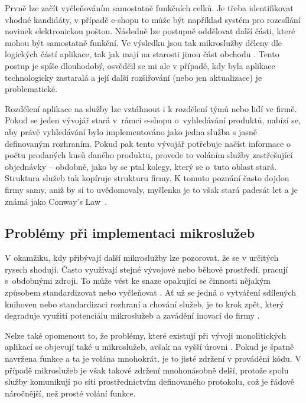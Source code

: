 \documentclass[FM,DP]{tulthesis}
\begin{document}
Prvně lze začít vyčleňováním samostatně funkčních celků. Je třeba identifikovat vhodné kandidáty, v případě e-shopu
to může být například systém pro rozesílání novinek elektronickou poštou. Následně lze postupně oddělovat další
části, které mohou být samostatně funkční. Ve výsledku jsou tak mikroslužby děleny dle logických částí
aplikace, tak jak mají na starosti jinou část obchodu \cite[strana~11]{microservices}. Tento postup je 
spíše dlouhodobý, osvědčil se mi ale v případě, kdy byla aplikace technologicky zastaralá a její další rozšiřování
(nebo jen aktualizace) je problematické.

Rozdělení aplikace na služby lze vztáhnout i k rozdělení týmů nebo lidí ve firmě. Pokud se jeden vývojář stará v~rámci 
e-shopu o~vyhledávání produktů, nabízí se, aby právě vyhledávání bylo implementováno jako jedna služba s jasně 
definovaným rozhraním. Pokud pak tento vývojář potřebuje načíst informace o počtu prodaných kusů daného produktu, 
provede to voláním služby zastřešující objednávky -- obdobně, jako by se ptal kolegy, který se o~tuto oblast stará.
Struktura služeb tak kopíruje strukturu firmy. K tomuto poznání často dojdou firmy samy, aniž by si to uvědomovaly, 
myšlenka je to však stará padesát let a je známá jako Conway's Law~\cite{monolith}.

\subsection{Problémy při implementaci mikroslužeb}

V okamžiku, kdy přibývají další mikroslužby lze pozorovat, že se v určitých rysech shodují. Často využívají
stejné vývojové nebo běhové prostředí, pracují s~obdobnými zdroji. To může vést ke snaze opakující se činnosti
nějakým způsobem standardizovat nebo vyčleňovat \cite[strana~24]{microservices}. Ať už se jedná o vytváření 
sdílených knihoven  nebo standardizaci rozhraní a chování služeb, je to krok zpět, který degraduje 
využití potenciálu mikroslužeb a zavádění inovací do firmy \cite[strana~27]{devops}.

Nelze také opomenout to, že problémy, které existují při vývoji monolitických aplikací se objevují také
u mikroslužeb, avšak na vyšší úrovni \cite{microservices-blog}. Pokud je špatně navržena funkce a ta je 
volána mnohokrát, je to jisté zdržení v provádění kódu. V případě mikroslužeb je však takové zdržení 
mnohonásobně delší, protože spolu služby komunikují po síti prostřednictvím definovaného protokolu, 
což je řádově náročnější, než prosté volání funkce.
\end{document}

